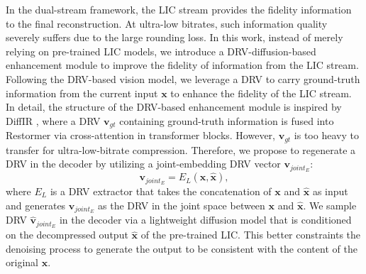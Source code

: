 In the dual-stream framework, the LIC stream provides the fidelity information to the final reconstruction. At ultra-low bitrates, such information quality severely suffers due to the large rounding loss. In this work, instead of merely relying on pre-trained LIC models, we introduce a DRV-diffusion-based enhancement module to improve the fidelity of information from the LIC stream. Following the DRV-based vision model, we leverage a DRV to carry ground-truth information from the current input $\textbf{x}$ to enhance the fidelity of the LIC stream. 
In detail, the structure of the DRV-based enhancement module is inspired by DiffIR \cite{xia2023diffir}, where a DRV $\textbf{v}_{gt}$ containing ground-truth information is fused into Restormer via cross-attention in transformer blocks.  However, $\textbf{v}_{gt}$ is too heavy to transfer for ultra-low-bitrate compression. Therefore, we propose to regenerate a DRV in the decoder by utilizing a joint-embedding DRV vector $\textbf{v}_{joint_{E}}$:
\begin{equation}
    \textbf{v}_{joint_{E}} = E_{L}(\textbf{x}, \hat{\textbf{x}}),
\end{equation}
where $E_{L}$ is a DRV extractor that takes the concatenation of $\textbf{x}$ and $\hat{\textbf{x}}$ as input and generates $\textbf{v}_{joint_{E}}$ as the DRV in the joint space between $\textbf{x}$ and $\hat{\textbf{x}}$. We sample DRV $\hat{\textbf{v}}_{joint_{E}}$ in the decoder via a lightweight diffusion model that is conditioned on the decompressed output $\hat{\textbf{x}}$ of the pre-trained LIC. This better constraints the denoising process to generate the output to be consistent with the content of the original $\textbf{x}$.

